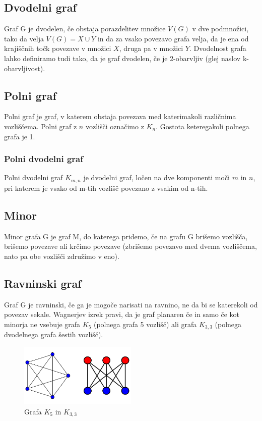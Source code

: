\documentclass[11pt]{article}
\begin{document}
\subsection{Dvodelni graf}

Graf G je dvodelen, če obstaja porazdelitev množice $V(G)$ v dve podmnožici, tako da velja $V(G) = X \cup Y$ in da za vsako povezavo grafa velja, da je ena od krajiščnih točk povezave v množici $X$, druga pa v množici $Y$. Dvodelnost grafa lahko definiramo tudi tako, da je graf dvodelen, če je 2-obarvljiv (glej naslov k-obarvljivost). \cite{studentka}

\subsection{Polni graf}

Polni graf je graf, v katerem obstaja povezava med katerimakoli različnima vozliščema. Polni graf z $n$ vozlišči označimo z $K_n$. Gostota keteregakoli polnega grafa je 1. \cite{zapiski}

\subsubsection{Polni dvodelni graf}

Polni dvodelni graf $K_{m,n}$ je dvodelni graf, ločen na dve komponenti moči $m$ in $n$, pri katerem je vsako od m-tih vozlišč povezano z vsakim od n-tih. \cite{studentka}

\subsection{Minor}

Minor grafa G je graf M, do katerega pridemo, če na grafu G brišemo vozlišča, brišemo povezave ali krčimo povezave (zbrišemo povezavo med dvema vozliščema, nato pa obe vozlišči združimo v eno). \cite{planar}

\subsection{Ravninski graf}

Graf G je ravninski, če ga je mogoče narisati na ravnino, ne da bi se katerekoli od povezav sekale. Wagnerjev izrek pravi, da je graf planaren če in samo če kot minorja ne vsebuje grafa $K_5$ (polnega grafa 5 vozlišč) ali grafa $K_{3, 3}$ (polnega dvodelnega grafa šestih vozlišč). \cite{planar, studentka}

\begin{figure}[H]
    \centering
    \includegraphics[width=0.5\textwidth]{k5_k33.png}
    \caption{Grafa $K_5$ in $K_{3, 3}$ \cite{planar}}
    \label{fig:mesh1}
\end{figure}
\end{document}
